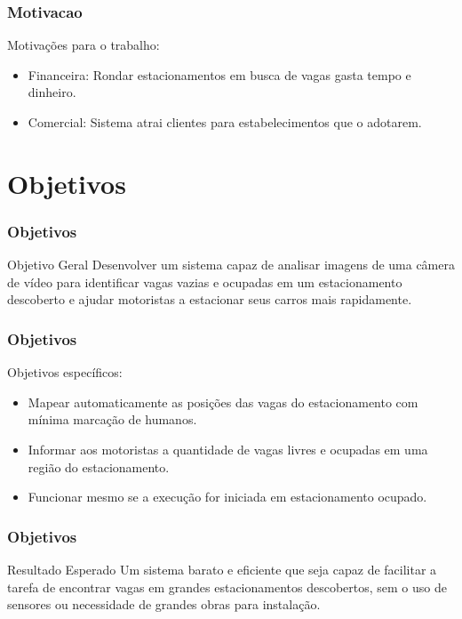 \documentclass{beamer}
\begin{document}
\begin{frame}
\frametitle{Motivacao}
Motivações para o trabalho:
\begin{itemize}
  \item Financeira: Rondar estacionamentos em busca de vagas gasta tempo e dinheiro.
  \item Comercial: Sistema atrai clientes para estabelecimentos que o adotarem.
\end{itemize}

\end{frame}


\section{Objetivos}
\begin{frame}
\frametitle{Objetivos}
\begin{block}{Objetivo Geral}
Desenvolver um sistema capaz de analisar imagens de uma câmera de vídeo para identificar vagas vazias e ocupadas em um estacionamento descoberto e ajudar motoristas a estacionar seus carros mais rapidamente.
\end{block}

\end{frame}
\begin{frame}
\frametitle{Objetivos}
Objetivos específicos:
\begin{itemize}
  \item Mapear automaticamente as posições das vagas do estacionamento com mínima marcação de humanos.
  \item Informar aos motoristas a quantidade de vagas livres e ocupadas em uma região do estacionamento.
  \item Funcionar mesmo se a execução for iniciada em estacionamento ocupado.
\end{itemize}

\end{frame}
\begin{frame}
\frametitle{Objetivos}
\begin{block}{Resultado Esperado}
Um sistema barato e eficiente que seja capaz de facilitar a tarefa de encontrar vagas em grandes estacionamentos descobertos, sem o uso de sensores ou necessidade de grandes obras para instalação.
\end{block}
\end{frame}
\end{document}
